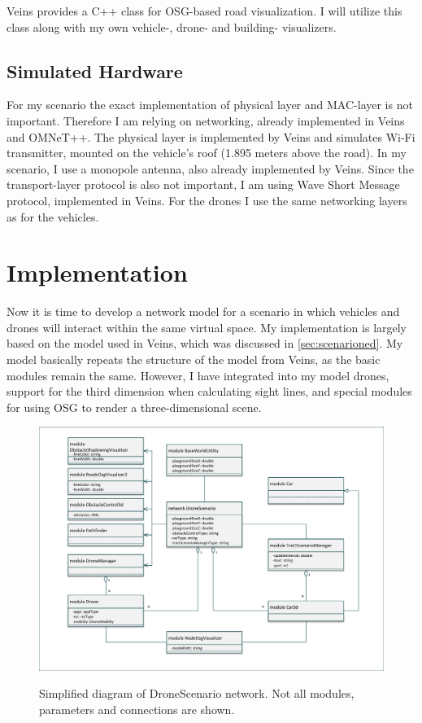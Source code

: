 \documentclass[]{nsm-thesis}
\begin{document}
Veins provides a C++ class for \ac{OSG}-based road visualization. I will utilize this class along with my own vehicle-, drone- and building- visualizers.

\section{Simulated Hardware}

For my scenario the exact implementation of physical layer and \ac{MAC}-layer is not important. Therefore I am relying on networking, already implemented in Veins and OMNeT++. The physical layer is implemented by Veins and simulates Wi-Fi transmitter, mounted on the vehicle's roof (1.895 meters above the road). In my scenario, I use a monopole antenna, also already implemented by Veins. Since the transport-layer protocol is also not important, I am using Wave Short Message protocol, implemented in Veins. For the drones I use the same networking layers as for the vehicles.

\chapter{Implementation}

Now it is time to develop a network model for a scenario in which vehicles and drones will interact within the same virtual space. My implementation is largely based on the model used in Veins, which was discussed in \cref{sec:scenarioned}. My model basically repeats the structure of the model from Veins, as the basic modules remain the same. However, I have integrated into my model drones, support for the third dimension when calculating sight lines, and special modules for using OSG to render a three-dimensional scene.

\begin{figure}
  	\caption{Simplified diagram of DroneScenario network. Not all modules, parameters and connections are shown.}
	\centering
	\includegraphics[width=1\textwidth]{figures/DroneScenario.pdf}
	\label{fig:dronescenarioned}
\end{figure}
\end{document}
